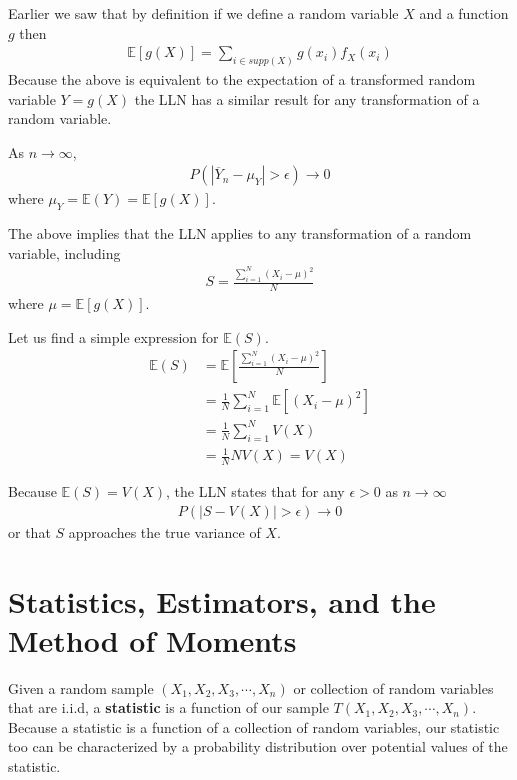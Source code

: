 Earlier we saw that by definition if we define a random variable $X$ and a function $g$ then
\begin{align}
    \mathbb{E}\left[ g(X) \right] = \sum_{i \in supp(X)} g(x_{i}) f_{X}(x_{i})
\end{align}
Because the above is equivalent to the expectation of a transformed random variable $Y = g(X)$ the LLN has a similar result for any transformation of a random variable. 

As $n \to \infty$,
\begin{align}
    P( | \overline{Y}_{n} - \mu_{Y}| > \epsilon ) \to 0 
\end{align}
where $\mu_{Y} = \mathbb{E}(Y) = \mathbb{E}\left[g(X)\right]$.

The above implies that the LLN applies to any transformation of a random variable, including 
\begin{align}
    S = \frac{\sum_{i=1}^{N} ( X_{i} - \mu  )^{2}}{N}
\end{align}
where $\mu = \mathbb{E}[g(X)]$. 

Let us find a simple expression for $\mathbb{E}(S)$. 
\begin{align}
    \mathbb{E}(S) &= \mathbb{E} \left[ \frac{\sum_{i=1}^{N} ( X_{i} - \mu  )^{2}}{N}\right] \\ 
                  &= \frac{1}{N} \sum_{i=1}^{N} \mathbb{E}\left[( X_{i} - \mu  )^{2}\right]\\
                  &= \frac{1}{N} \sum_{i=1}^{N} V(X)\\
                  &= \frac{1}{N}  N V(X)  = V(X)
\end{align}

Because $\mathbb{E}(S) = V(X)$, the LLN states that for any $\epsilon >0$ as $n \to \infty$
\begin{align}
    P(|S - V(X)| > \epsilon) \to 0
\end{align}
or that $S$ approaches the true variance of $X$.


\section{Statistics, Estimators, and the Method of Moments}\label{intro}

Given a random sample $(X_{1}, X_{2}, X_{3}, \cdots, X_{n})$ or collection of random variables that are i.i.d, a  \textbf{statistic} is a function of our sample $T(X_{1},X_{2},X_{3},\cdots,X_{n})$.
Because a statistic is a function of a collection of random variables, our statistic too can be characterized by a probability distribution over potential values of the statistic.


